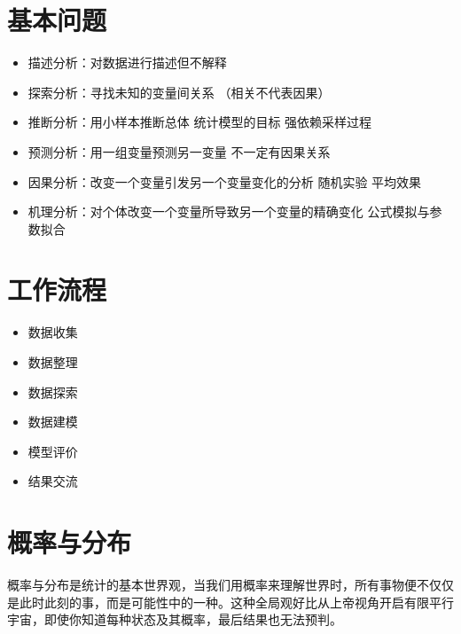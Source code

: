 \documentclass[
]{book}
\providecommand{\tightlist}{%
  \setlength{\itemsep}{0pt}\setlength{\parskip}{0pt}}
\begin{document}
\hypertarget{ux57faux672cux95eeux9898}{%
\section{基本问题}\label{ux57faux672cux95eeux9898}}

\begin{itemize}
\tightlist
\item
  描述分析：对数据进行描述但不解释
\item
  探索分析：寻找未知的变量间关系 （相关不代表因果）
\item
  推断分析：用小样本推断总体 统计模型的目标 强依赖采样过程
\item
  预测分析：用一组变量预测另一变量 不一定有因果关系
\item
  因果分析：改变一个变量引发另一个变量变化的分析 随机实验 平均效果
\item
  机理分析：对个体改变一个变量所导致另一个变量的精确变化 公式模拟与参数拟合
\end{itemize}

\hypertarget{ux5de5ux4f5cux6d41ux7a0b}{%
\section{工作流程}\label{ux5de5ux4f5cux6d41ux7a0b}}

\begin{itemize}
\tightlist
\item
  数据收集
\item
  数据整理
\item
  数据探索
\item
  数据建模
\item
  模型评价
\item
  结果交流
\end{itemize}

\hypertarget{ux6982ux7387ux4e0eux5206ux5e03}{%
\section{概率与分布}\label{ux6982ux7387ux4e0eux5206ux5e03}}

概率与分布是统计的基本世界观，当我们用概率来理解世界时，所有事物便不仅仅是此时此刻的事，而是可能性中的一种。这种全局观好比从上帝视角开启有限平行宇宙，即使你知道每种状态及其概率，最后结果也无法预判。
\end{document}
